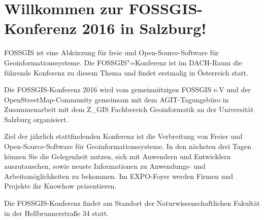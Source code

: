 \newpage
\section*{Willkommen zur FOSSGIS-Konferenz 2016 in Salzburg!} \label{welcome}
FOSSGIS ist eine Abkürzung für freie und Open-Source-Software für Geoinformationssysteme.
Die FOSSGIS"=Konferenz ist im DACH-Raum die führende Konferenz zu diesem Thema und findet erstmalig in Österreich statt.

Die FOSSGIS-Konferenz 2016 wird vom gemeinnützigen FOSSGIS e.V und der OpenStreetMap-Community gemeinsam
mit dem AGIT-Tagungsbüro in Zusammenarbeit mit dem Z\_GIS Fachbereich Geoinformatik an der Universität Salzburg organisiert.

Ziel der jährlich stattfindenden Konferenz ist die Verbreitung von Freier und Open-Source-Software für Geoinformationssysteme.
In den nächsten drei Tagen können Sie die Gelegenheit nutzen, sich mit Anwendern und Entwicklern auszutauschen,
sowie neuste Informationen zu Anwendungs- und Arbeitsmöglichkeiten zu bekommen. Im EXPO-Foyer werden Firmen und Projekte ihr Know\-how präsentieren.

Die FOSSGIS-Konferenz findet am Standort der Naturwissenschaftlichen Fakultät in der Hellbrunnerstraße 34 statt.

\newpage
